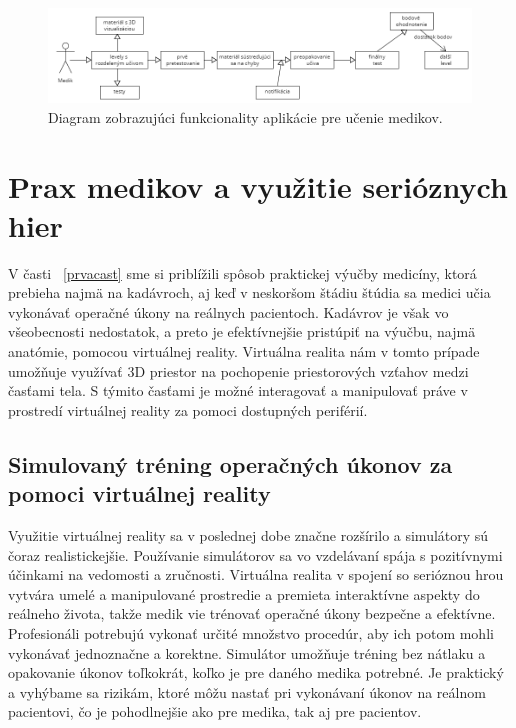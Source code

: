 \documentclass[10pt,twoside,slovak,a4paper]{article}
\begin{document}
\begin{figure}[tbh]
\centering
\includegraphics[scale=0.35]{dia.png}
\caption{Diagram zobrazujúci funkcionality aplikácie pre učenie medikov.}
\label{diagram}
\end{figure}


\section{Prax medikov a využitie serióznych hier} \label{tretiacast}
V časti ~\ref{prvacast} sme si priblížili spôsob praktickej výučby medicíny, ktorá prebieha najmä na kadávroch, aj keď v neskoršom štádiu štúdia sa medici učia vykonávať operačné úkony na reálnych pacientoch. Kadávrov je však vo všeobecnosti nedostatok, a preto je efektívnejšie pristúpiť na výučbu, najmä anatómie, pomocou virtuálnej reality. Virtuálna realita nám v tomto prípade umožňuje využívať 3D priestor na pochopenie priestorových vzťahov medzi časťami tela. S týmito časťami je možné interagovať a manipulovať práve v prostredí virtuálnej reality za pomoci dostupných periférií.  \cite{9678721}

\subsection{Simulovaný tréning operačných úkonov za pomoci virtuálnej reality} \label{tretiacast:surgery} 
Využitie virtuálnej reality sa v poslednej dobe značne rozšírilo a simulátory sú čoraz realistickejšie. Používanie simulátorov sa vo vzdelávaní spája s pozitívnymi účinkami na vedomosti a zručnosti. Virtuálna realita v spojení so serióznou hrou vytvára umelé a manipulované prostredie a premieta interaktívne aspekty do reálneho života, takže medik vie trénovať operačné úkony bezpečne a efektívne. Profesionáli potrebujú vykonať určité množstvo procedúr, aby ich potom mohli vykonávať jednoznačne a korektne. Simulátor umožňuje tréning bez nátlaku a opakovanie úkonov toľkokrát, koľko je pre daného medika potrebné. Je praktický a vyhýbame sa rizikám, ktoré môžu nastať pri vykonávaní úkonov na reálnom pacientovi, čo je pohodlnejšie ako pre medika, tak aj pre pacientov. \cite{DUARTE2020254}
\end{document}
